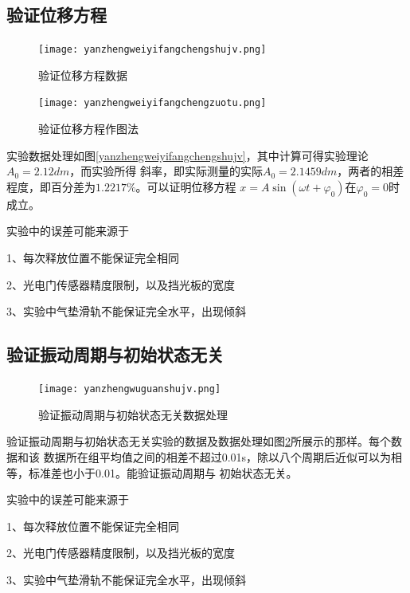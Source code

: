 \documentclass{ctexart}
\begin{document}
  \subsection{验证位移方程}
  \begin{figure}[b]
    \centering
    \begin{minipage}[b]{0.48\textwidth}
      \centering
      \texttt{[image: yanzhengweiyifangchengshujv.png]}
      \caption{验证位移方程数据}\label{yanzhengweiyifangchengshujv}
    \end{minipage}
    \begin{minipage}[b]{0.48\textwidth}
      \centering
      \texttt{[image: yanzhengweiyifangchengzuotu.png]}
      \caption{验证位移方程作图法}\label{yanzhengweiyifangchengzuotu}
    \end{minipage}
  \end{figure}

  实验数据处理如图\ref{yanzhengweiyifangchengshujv}，其中计算可得实验理论$A_{0}=2.12dm$，而实验所得
  斜率，即实际测量的实际$A_{0}=2.1459dm$，两者的相差程度，即百分差为$1.2217\%$。可以证明位移方程
  $x=A\sin \left( \omega t + {\varphi}_{0} \right) \mbox{在}{\varphi}_{0} = 0 $时成立。

  实验中的误差可能来源于

  1、每次释放位置不能保证完全相同

  2、光电门传感器精度限制，以及挡光板的宽度

  3、实验中气垫滑轨不能保证完全水平，出现倾斜

  \subsection{验证振动周期与初始状态无关}
  \begin{figure}[t]
    \centering
    \texttt{[image: yanzhengwuguanshujv.png]}
    \caption{验证振动周期与初始状态无关数据处理}\label{yanzhengwuguanshujv}
  \end{figure}
  验证振动周期与初始状态无关实验的数据及数据处理如图\ref{yanzhengwuguanshujv}所展示的那样。每个数据和该
  数据所在组平均值之间的相差不超过0.01s，除以八个周期后近似可以为相等，标准差也小于0.01。能验证振动周期与
  初始状态无关。

  实验中的误差可能来源于
  
  1、每次释放位置不能保证完全相同

  2、光电门传感器精度限制，以及挡光板的宽度

  3、实验中气垫滑轨不能保证完全水平，出现倾斜
\end{document}
